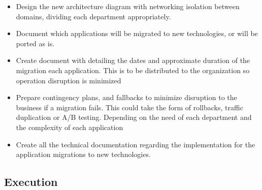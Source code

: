 \documentclass{llncs}
\begin{document}
\begin{itemize}

  \item Design the new architecture diagram with networking isolation between domains, dividing each department appropriately.
  \item Document which applications will be migrated to new technologies, or will be ported as is.
  \item Create document with detailing the dates and approximate duration of the migration each application. This is to be distributed to the organization so operation disruption is minimized
  \item Prepare contingency plans, and fallbacks to minimize disruption to the business if a migration fails. This could take the form of rollbacks, traffic duplication or A/B testing. Depending on the need of each department and the complexity of each application
  \item Create all the technical documentation regarding the implementation for the application migrations to new technologies.
\end{itemize}

\subsection{Execution}
\end{document}
